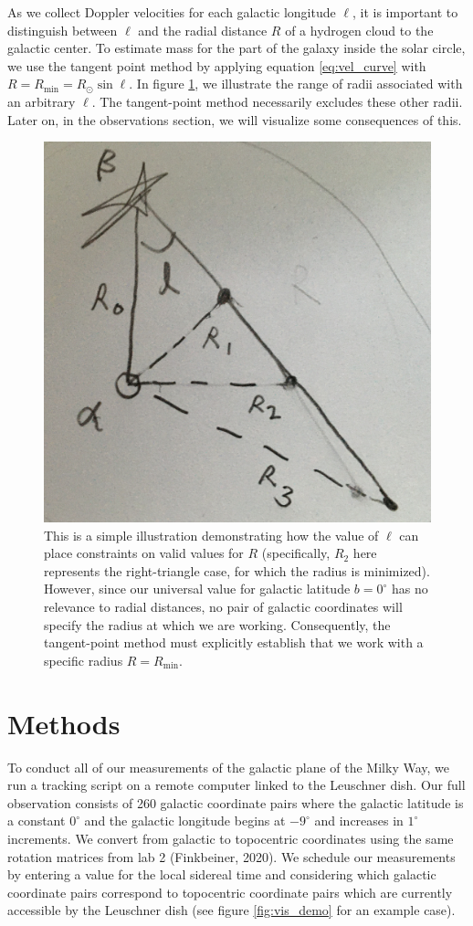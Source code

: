 \documentclass[12pt]{article}
\begin{document}
As we collect Doppler velocities for each galactic longitude $\ell$, it is important to distinguish between $\ell$ and the radial distance $R$ of a hydrogen cloud to the galactic center. To estimate mass for the part of the galaxy inside the solar circle, we use the tangent point method by applying equation \ref{eq:vel_curve} with $R = R_\text{min} = R_\odot \sin \ell$. In figure \ref{fig:ell_vs_r}, we illustrate the range of radii associated with an arbitrary $\ell$. The tangent-point method necessarily excludes these other radii. Later on, in the observations section, we will visualize some consequences of this.

\begin{figure}
	\centering
	\includegraphics[width=.4\linewidth]{ell_versus_r}
	\caption{This is a simple illustration demonstrating how the value of $\ell$ can place constraints on valid values for $R$ (specifically, $R_2$ here represents the right-triangle case, for which the radius is minimized). However, since our universal value for galactic latitude $b = 0^\circ$ has no relevance to radial distances, no pair of galactic coordinates will specify the radius at which we are working. Consequently, the tangent-point method must explicitly establish that we work with a specific radius $R = R_\text{min}$.}
	\label{fig:ell_vs_r}
\end{figure}

\section{Methods}

\quad \quad To conduct all of our measurements of the galactic plane of the Milky Way, we run a tracking script on a remote computer linked to the Leuschner dish. Our full observation consists of 260 galactic coordinate pairs where the galactic latitude is a constant $0^\circ$ and the galactic longitude begins at $-9^\circ$ and increases in $1^\circ$ increments. We convert from galactic to topocentric coordinates using the same rotation matrices from lab 2 (Finkbeiner, 2020). We schedule our measurements by entering a value for the local sidereal time and considering which galactic coordinate pairs correspond to topocentric coordinate pairs which are currently accessible by the Leuschner dish (see figure \ref{fig:vis_demo} for an example case).
\end{document}
